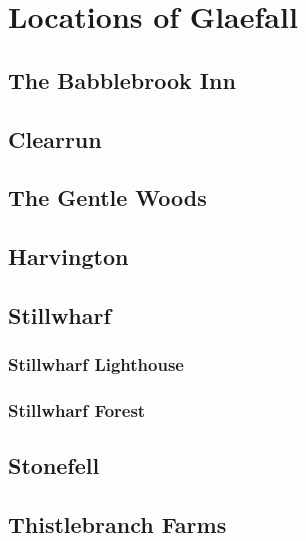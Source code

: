 \chapter{Locations of Glaefall}

\section{The Babblebrook Inn}

\section{Clearrun}

\section{The Gentle Woods}

\section{Harvington}

\section{Stillwharf}

\subsection{Stillwharf Lighthouse}

\subsection{Stillwharf Forest}

\section{Stonefell}

\section{Thistlebranch Farms}
